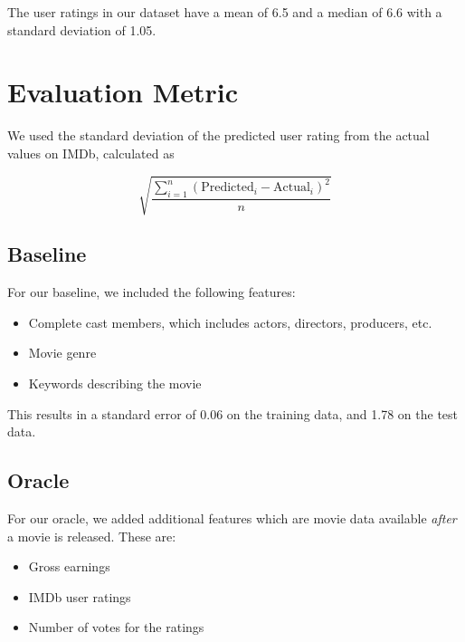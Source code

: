 \documentclass[journal]{IEEEtran}
\begin{document}

The user ratings in our dataset have a mean of 6.5 and a median of 6.6 with a standard deviation of 1.05.

\section{Evaluation Metric}
We used the standard deviation of the predicted user rating from the actual values on IMDb, calculated as

$$ \sqrt{\frac{\sum_{i=1}^n(\text{Predicted}_i-\text{Actual}_i)^2}{n}} $$

\subsection{Baseline}
For our baseline, we included the following features:
\begin{itemize}
	\item Complete cast members, which includes actors, directors, producers, etc.
	\item Movie genre
	\item Keywords describing the movie
\end{itemize}

This results in a standard error of 0.06 on the training data, and
1.78 on the test data.

\subsection{Oracle}
For our oracle, we added additional features which are movie data available
\emph{after} a movie is released. These are:
\begin{itemize}
	\item Gross earnings
	\item IMDb user ratings
	\item Number of votes for the ratings
\end{itemize}
\end{document}
